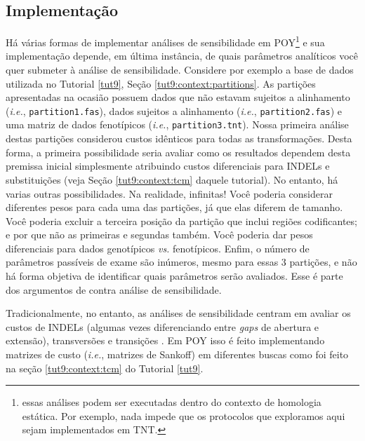 \begin{refsection}
\subsection{Implementação}\label{tut10:sa:implementation}

Há várias formas de implementar análises de sensibilidade em POY\footnote{ essas análises podem ser executadas dentro do contexto de homologia estática. Por exemplo, nada impede que os protocolos que exploramos aqui sejam implementados em TNT.} e sua implementação depende, em última instância, de quais parâmetros analíticos você quer submeter à análise de sensibilidade. Considere por exemplo a base de dados utilizada no Tutorial \ref{tut9}, Seção \ref{tut9:context:partitions}. As partições apresentadas na ocasião possuem dados que não estavam sujeitos a alinhamento (\textit{i.e.}, \texttt{partition1.fas}), dados sujeitos a alinhamento (\textit{i.e.}, \texttt{partition2.fas}) e uma matriz de dados fenotípicos (\textit{i.e.}, \texttt{partition3.tnt}). Nossa primeira análise destas partições considerou custos idênticos para todas as transformações. Desta forma, a primeira possibilidade seria avaliar como os resultados dependem desta premissa inicial simplesmente atribuindo custos diferenciais para INDELs e substituições (veja Seção \ref{tut9:context:tcm} daquele tutorial). No entanto, há varias outras possibilidades. Na realidade, infinitas! Você poderia considerar diferentes pesos para cada uma das partições, já que elas diferem de tamanho. Você poderia excluir a terceira posição da partição que inclui regiões codificantes; e por que não as primeiras e segundas também. Você poderia dar pesos diferenciais para dados genotípicos \textit{vs.} fenotípicos. Enfim, o número de parâmetros passíveis de exame são inúmeros, mesmo para essas 3 partições, e não há forma objetiva de identificar quais parâmetros serão avaliados. Esse é parte dos argumentos de \textcite{Grant_and_Kluge_2003} contra análise de sensibilidade.

Tradicionalmente, no entanto, as análises de sensibilidade centram em avaliar os custos de INDELs (algumas vezes diferenciando entre \textit{gaps} de abertura e extensão), transversões e transições \parencite{Wheeler_1995, Wheeler_and_Hayashi_1998, Giribet_and_Wheeler_1999, Phillips_et_al_2000, Giribet_2003, Wheeler_and_Giribet_2009}. Em POY isso é feito implementando matrizes de custo (\textit{i.e.}, matrizes de Sankoff) em diferentes buscas como foi feito na seção \ref{tut9:context:tcm} do Tutorial \ref{tut9}.


\end{refsection}
